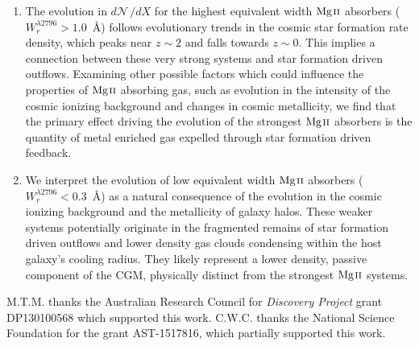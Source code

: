 \documentclass[iop,apj,numberedappendix,appendixfloats,twocolappendix]{emulateapj}
\begin{document}
\begin{enumerate}
\item The evolution in $d\mathcal{N}\,/dX$ for the highest equivalent width ${\hbox{{\rm Mg}\kern 0.1em{\sc ii}}}$ absorbers ($W_r^{\lambda2796} > 1.0$~{\AA}) follows evolutionary trends in the cosmic star formation rate density, which peaks near $z \sim 2$ and falls towards $z \sim 0$. This implies a connection between these very strong systems and star formation driven outflows. Examining other possible factors which could influence the properties of ${\hbox{{\rm Mg}\kern 0.1em{\sc ii}}}$ absorbing gas, such as evolution in the intensity of the cosmic ionizing background and changes in cosmic metallicity, we find that the primary effect driving the evolution of the strongest ${\hbox{{\rm Mg}\kern 0.1em{\sc ii}}}$ absorbers is the quantity of metal enriched gas expelled through star formation driven feedback.
\item We interpret the evolution of low equivalent width ${\hbox{{\rm Mg}\kern 0.1em{\sc ii}}}$ absorbers ($W_r^{\lambda2796} < 0.3$~{\AA}) as a natural consequence of the evolution in the cosmic ionizing background and the metallicity of galaxy halos. These weaker systems potentially originate in the fragmented remains of star formation driven outflows and lower density gas clouds condensing within the host galaxy's cooling radius. They likely represent a lower density, passive component of the CGM, physically distinct from the strongest ${\hbox{{\rm Mg}\kern 0.1em{\sc ii}}}$ systems.
\end{enumerate}

M.T.M. thanks the Australian Research Council for \textsl{Discovery Project} grant DP130100568 which supported this work. C.W.C. thanks the National Science Foundation for the grant AST-1517816, which partially supported this work.



\end{document}
